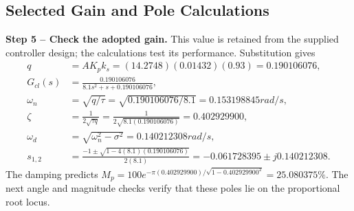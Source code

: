 \subsection{Selected Gain and Pole Calculations}
\textbf{Step 5 -- Check the adopted gain.} This value is retained from the supplied controller design; the calculations test its performance. Substitution gives
\begin{align}
q&=AK_pk_s=(14.2748)(0.01432)(0.93)=0.190106076,\\
G_{cl}(s)&=\frac{0.190106076}{8.1s^2+s+0.190106076},\\
\omega_n&=\sqrt{q/\tau}=\sqrt{0.190106076/8.1}=0.153198845\unit{rad/s},\\
\zeta&=\frac1{2\sqrt{\tau q}}=\frac1{2\sqrt{8.1(0.190106076)}}=0.402929900,\\
\omega_d&=\sqrt{\omega_n^2-\sigma^2}=0.140212308\unit{rad/s},\\
s_{1,2}&=\frac{-1\pm\sqrt{1-4(8.1)(0.190106076)}}{2(8.1)}
=-0.061728395\pm j0.140212308.
\end{align}
The damping predicts $M_p=100e^{-\pi(0.402929900)/\sqrt{1-0.402929900^2}}=25.080375\%$. The next angle and magnitude checks verify that these poles lie on the proportional root locus.
